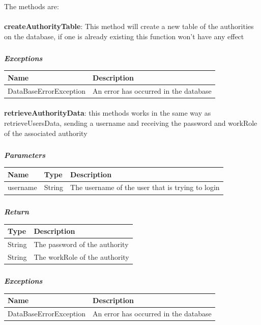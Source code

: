 						The methods are:
							\paragraph{}
							\textbf{createAuthorityTable}: This method will create a new table of the authorities on the database, if one is already existing this function won't have any effect
							\subparagraph{}
								\textit{\textbf{Exceptions}}
									\begin{table}[!h]
									\begin{tabular}{L{0.3\textwidth}L{0.3\textwidth}}
										\toprule
										Name & Description \\
										\midrule
								  		DataBaseErrorException & An error has occurred in the database \\ 
								 		\bottomrule
									\end{tabular}
								\end{table}
								
					\paragraph{}
							\textbf{retrieveAuthorityData}: this methods works in the same way as retrieveUsersData, sending a username and receiving the password and workRole of the associated authority
							\subparagraph{}
							\textit{\textbf{Parameters}}
								\begin{table}[!h]
									\begin{tabular}{L{0.2\textwidth}L{0.2\textwidth}L{0.2\textwidth}}
										\toprule
										Name & Type & Description \\
										\midrule
								  		username & String & The username of the user that is trying to login \\
								 		\bottomrule
									\end{tabular}
								\end{table}
							\subparagraph{}
								\textit{\textbf{Return}}
									\begin{table}[!h]
									\begin{tabular}{L{0.3\textwidth}L{0.3\textwidth}}
										\toprule
										Type & Description \\
										\midrule
								  		String & The password of the authority \\
								  		String & The workRole of the authority \\
								 		\bottomrule
									\end{tabular}
								\end{table}
							\subparagraph{}
								\textit{\textbf{Exceptions}}
									\begin{table}[!h]
									\begin{tabular}{L{0.3\textwidth}L{0.3\textwidth}}
										\toprule
										Name & Description \\
										\midrule
								  		DataBaseErrorException & An error has occurred in the database \\ 
								 		\bottomrule
									\end{tabular}
								\end{table}
								
